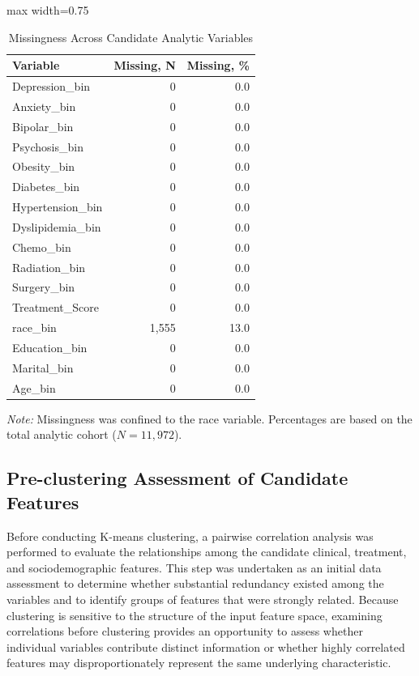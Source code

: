 \documentclass[11pt]{article}
\begin{document}
\begin{table}[H]
\centering
\caption{Missingness Across Candidate Analytic Variables}
\label{tab:missingness}

\begin{adjustbox}{max width=0.75\textwidth}
\begin{tabular}{lrr}
\toprule
\textbf{Variable} & \textbf{Missing, N} & \textbf{Missing, \%} \\
\midrule
Depression\_bin & 0 & 0.0 \\
Anxiety\_bin & 0 & 0.0 \\
Bipolar\_bin & 0 & 0.0 \\
Psychosis\_bin & 0 & 0.0 \\
Obesity\_bin & 0 & 0.0 \\
Diabetes\_bin & 0 & 0.0 \\
Hypertension\_bin & 0 & 0.0 \\
Dyslipidemia\_bin & 0 & 0.0 \\
Chemo\_bin & 0 & 0.0 \\
Radiation\_bin & 0 & 0.0 \\
Surgery\_bin & 0 & 0.0 \\
Treatment\_Score & 0 & 0.0 \\
race\_bin & 1,555 & 13.0 \\
Education\_bin & 0 & 0.0 \\
Marital\_bin & 0 & 0.0 \\
Age\_bin & 0 & 0.0 \\
\bottomrule
\end{tabular}
\end{adjustbox}

\vspace{2mm}

\begin{flushleft}
\footnotesize
\textit{Note:} Missingness was confined to the race variable. Percentages are based on the total analytic cohort ($N=11,972$).
\end{flushleft}

\end{table}

\subsection{Pre-clustering Assessment of Candidate Features}

Before conducting K-means clustering, a pairwise correlation analysis was performed to evaluate the relationships among the candidate clinical, treatment, and sociodemographic features. This step was undertaken as an initial data assessment to determine whether substantial redundancy existed among the variables and to identify groups of features that were strongly related. Because clustering is sensitive to the structure of the input feature space, examining correlations before clustering provides an opportunity to assess whether individual variables contribute distinct information or whether highly correlated features may disproportionately represent the same underlying characteristic.
\end{document}
